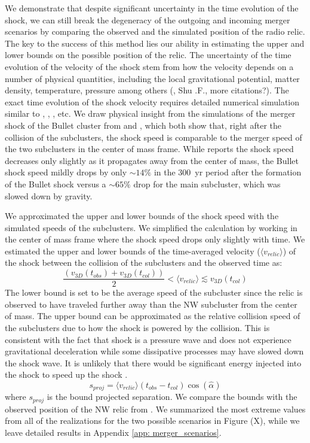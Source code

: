 We demonstrate that despite significant uncertainty in the time
evolution of the shock, we can still break the degeneracy of the
outgoing and incoming merger scenarios by comparing the observed and the
simulated position of the radio relic.
The key to the success of this method lies our ability in estimating the
upper and lower bounds on the possible position of the relic. The
uncertainty of the time evolution of the velocity of the shock stem from
how the velocity depends on a number of physical quantities, including the
local gravitational potential, matter density, temperature, pressure among
others (\citealt{E98}, Shu .F., more citations?).  The exact time evolution
of the shock velocity requires detailed numerical simulation similar to
\citet{Springel2007}, \citet{Vazza11}, \citet{Kang2007}, etc. 
We draw physical insight from the
simulations of the merger shock of the Bullet cluster from
\citet{Springel2007} and \citet{Paul2011b}, which both show
that, right after the collision of the subclusters, the shock speed is
comparable to the merger speed of the two subclusters in the center of mass
frame.  While \citet{Paul2011b} reports the shock speed decreases only
slightly as it propagates away from the center of mass, the Bullet shock
speed mildly drops by only $\sim 14\%$ in the 300~\mega yr period after the
formation of the Bullet shock versus a $\sim65\%$ drop for the main subcluster, which was slowed down by gravity. 

We approximated the upper and lower bounds of the shock speed with the
simulated speeds of the subclusters.  We simplified the calculation by
working in the center of mass frame where the shock speed drops only
slightly with time. We estimated the upper and lower bounds of the
time-averaged velocity ($\langle v_{relic} \rangle$) of the shock between
the collision of the subclusters and the observed time as:  
\begin{equation}
	\frac{(v_{3D}(t_{obs}) + v_{3D}(t_{col}))}{2}	< \langle v_{relic} \rangle \lesssim v_{3D}(t_{col}) 
\end{equation}
The lower bound is set to be the average speed of the subcluster since the
relic is observed to have traveled further away than the NW subcluster from
the center of mass. The upper bound can be approximated as the relative
collision speed of the subclusters due to how the shock is powered by the
collision. This is consistent with the fact that shock is a pressure wave
and does not experience gravitational deceleration while some dissipative
processes may have slowed down the shock wave. It is unlikely that there
would be significant energy injected into the shock to speed up the shock .
\begin{equation}
	s_{proj} = \langle v_{relic} \rangle (t_{obs} - t_{col}) \cos(\hat{\alpha})
\end{equation}
where $s_{proj}$ is the bound projected separation. 
We compare the bounds with the observed position of the NW relic from
\citet{L13}. We summarized the most extreme values from all of the realizations
for the two possible scenarios in Figure (X), while we leave detailed
results in Appendix \ref{app: merger_scenarios}.

